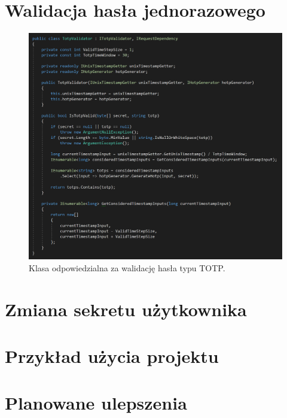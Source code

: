 \section{Walidacja hasła jednorazowego}
\begin{figure}[t]
    \centering
	\includegraphics[width=\textwidth]{content/images/code-tvalidator}
    \caption{Klasa odpowiedzialna za walidację hasła typu TOTP.}
    \label{totp-validator}
\end{figure}
\section{Zmiana sekretu użytkownika}

\section{Przykład użycia projektu}

\section{Planowane ulepszenia}


